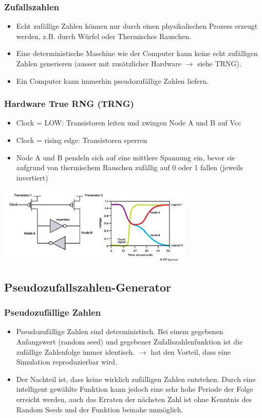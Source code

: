 \subsubsection{Zufallszahlen}
\begin{itemize}
	\item Echt zufällige Zahlen können nur durch einen physikalischen Prozess erzeugt werden, z.B. durch Würfel oder Thermisches Rauschen.
	\item Eine deterministische Maschine wie der Computer kann keine echt zufälligen Zahlen generieren (ausser mit zusätzlicher Hardware $\rightarrow$ siehe TRNG).
	\item Ein Computer kann immerhin pseudozufällige Zahlen liefern.
\end{itemize}

\subsubsection{Hardware True RNG (TRNG)}
\begin{itemize}
    \item Clock = LOW: Transistoren leiten und zwingen Node A und B auf Vcc
    \item Clock = rising edge: Transistoren sperren
    \item Node A und B pendeln sich auf eine mittlere Spannung ein, bevor sie aufgrund von thermischem Rauschen zufällig auf 0 oder 1 fallen (jeweils invertiert)
\end{itemize}

\includegraphics[width=0.7\textwidth]{images/Simulation/TRNG.png}

\subsection{Pseudozufallszahlen-Generator}
\subsubsection{Pseudozufällige Zahlen}
\begin{itemize}
	\item Pseudozufällige Zahlen sind deterministisch. Bei einem gegebenen Anfangswert (random seed) und gegebener Zufallszahlenfunktion ist die zufällige Zahlenfolge immer identisch. $\rightarrow$ hat den Vorteil, dass eine Simulation reproduzierbar wird.
	\item Der Nachteil ist, dass keine wirklich zufälligen Zahlen entstehen. Durch eine intelligent gewählte Funktion kann jedoch eine sehr hohe Periode der Folge erreicht werden, auch das Erraten der nächsten Zahl ist ohne Kenntnis des Random Seeds und der Funktion beinahe unmöglich.
\end{itemize}

